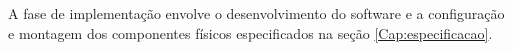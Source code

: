 \label{Cap:implementacao}

A fase de implementação envolve o desenvolvimento do software e a configuração e montagem dos componentes físicos  especificados na seção \ref{Cap:especificacao}.


